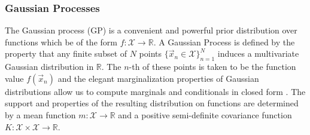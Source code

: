 \documentclass[12pt, a4paper]{article}
\begin{document}
\subsubsection{Gaussian Processes}
The Gaussian process (GP) is a convenient and powerful prior distribution over functions which be of the form $f : \mathcal{X} \rightarrow \mathbb{R}$. A Gaussian Process is defined by the property that any finite subset of $N$ points $\{ \vec{x}_n \in \mathcal{X}\}_{n=1}^N$ induces a multivariate Gaussian distribution in $\mathbb{R}$. The $n$-th of these points is taken to be the function value $f(\vec{x}_n)$ and the elegant marginalization properties of Gaussian distributions allow us to compute marginals and conditionals in closed form \cite{Snoek2012}. The support and properties of the resulting distribution on functions are determined by a mean function $m : \mathcal{X} \rightarrow \mathbb{R}$ and a positive semi-definite covariance function $K : \mathcal{X} \times \mathcal{X} \rightarrow \mathbb{R}$.
\end{document}

